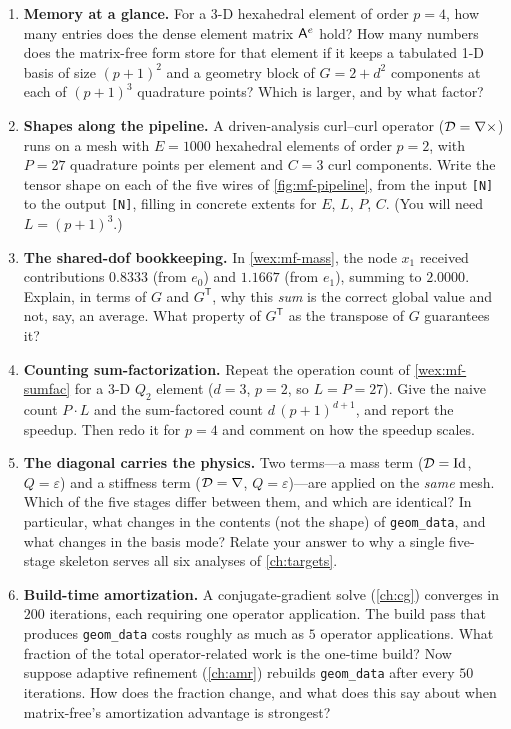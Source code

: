 \exercisessection
\begin{enumerate}[nosep]
  \item \textbf{Memory at a glance.} For a 3-D hexahedral element of order $p=4$,
  how many entries does the dense element matrix $\mathsf{A}^e$ hold? How many
  numbers does the matrix-free form store for that element if it keeps a tabulated
  1-D basis of size $(p+1)^2$ and a geometry block of $G=2+d^2$ components at each
  of $(p+1)^3$ quadrature points? Which is larger, and by what factor?

  \item \textbf{Shapes along the pipeline.} A driven-analysis curl--curl operator
  ($\mathcal{D}=\nabla\times$) runs on a mesh with $E=\num{1000}$ hexahedral elements of
  order $p=2$, with $P=27$ quadrature points per element and $C=3$ curl components.
  Write the tensor shape on each of the five wires of \cref{fig:mf-pipeline},
  from the input \lstinline[style=l4style]|[N]| to the output
  \lstinline[style=l4style]|[N]|, filling in concrete extents for $E$, $L$, $P$,
  $C$. (You will need $L=(p+1)^3$.)

  \item \textbf{The shared-dof bookkeeping.} In
  \cref{wex:mf-mass}, the node $x_1$ received contributions
  $0.8333$ (from $e_0$) and $1.1667$ (from $e_1$), summing to $2.0000$. Explain,
  in terms of $G$ and $G^{\mathsf T}$, why this \emph{sum} is the correct global
  value and not, say, an average. What property of $G^{\mathsf T}$ as the
  transpose of $G$ guarantees it?

  \item \textbf{Counting sum-factorization.} Repeat the operation count of
  \cref{wex:mf-sumfac} for a 3-D $Q_2$ element ($d=3$, $p=2$, so $L=P=27$).
  Give the naive count $P\cdot L$ and the sum-factored count $d\,(p+1)^{d+1}$, and
  report the speedup. Then redo it for $p=4$ and comment on how the speedup scales.

  \item \textbf{The diagonal carries the physics.} Two terms---a mass term
  ($\mathcal{D}=\mathrm{Id}$, $Q=\varepsilon$) and a stiffness term ($\mathcal{D}=\nabla$,
  $Q=\varepsilon$)---are applied on the \emph{same} mesh. Which of the five stages
  differ between them, and which are identical? In particular, what changes in the
  contents (not the shape) of \texttt{geom\_data}, and what changes in the basis
  mode? Relate your answer to why a single five-stage skeleton serves all six
  analyses of \cref{ch:targets}.

  \item \textbf{Build-time amortization.} A conjugate-gradient solve
  (\cref{ch:cg}) converges in $200$ iterations, each requiring one operator
  application. The build pass that produces \texttt{geom\_data} costs roughly as
  much as $5$ operator applications. What fraction of the total operator-related
  work is the one-time build? Now suppose adaptive refinement (\cref{ch:amr})
  rebuilds \texttt{geom\_data} after every $50$ iterations. How does the fraction
  change, and what does this say about when matrix-free's amortization advantage
  is strongest?


\end{enumerate}

